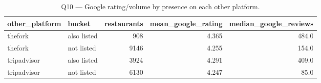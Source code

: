 \begin{table}[ht]
\centering
\caption{Q10 — Google rating/volume by presence on each other platform.}
\label{tab:q10_rating_by_presence}
{\tiny
\begin{tabular}{llrrr}
\toprule
other\_platform & bucket & restaurants & mean\_google\_rating & median\_google\_reviews \\
\midrule
thefork & also listed & 908 & 4.365 & 484.0 \\
thefork & not listed & 9146 & 4.255 & 154.0 \\
tripadvisor & also listed & 3924 & 4.291 & 409.0 \\
tripadvisor & not listed & 6130 & 4.247 & 85.0 \\
\bottomrule
\end{tabular}
}
\end{table}
